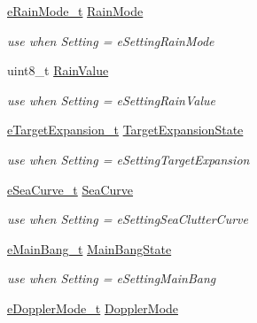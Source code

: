 \begin{DoxyCompactItemize}
\mbox{\hyperlink{namespace_quantum_lib_a881f6940f59e1d22cecd947de841b245}{e\+Rain\+Mode\+\_\+t}} \mbox{\hyperlink{union_quantum_lib_1_1_setting_data__t_1_1_value__t_ab7b3cb7d32eb42493f3e2621419b2974}{Rain\+Mode}}
\begin{DoxyCompactList}\small\item\em use when \textquotesingle{}Setting\textquotesingle{} = e\+Setting\+Rain\+Mode \end{DoxyCompactList}\item 
uint8\+\_\+t \mbox{\hyperlink{union_quantum_lib_1_1_setting_data__t_1_1_value__t_a7040a794b6b449a10ef05f067e1e8530}{Rain\+Value}}
\begin{DoxyCompactList}\small\item\em use when \textquotesingle{}Setting\textquotesingle{} = e\+Setting\+Rain\+Value \end{DoxyCompactList}\item 
\mbox{\hyperlink{namespace_quantum_lib_affbc8bc0775b14917688e0e6d2fab0fb}{e\+Target\+Expansion\+\_\+t}} \mbox{\hyperlink{union_quantum_lib_1_1_setting_data__t_1_1_value__t_aa016c87a2de4e94c31be3385d5ba7358}{Target\+Expansion\+State}}
\begin{DoxyCompactList}\small\item\em use when \textquotesingle{}Setting\textquotesingle{} = e\+Setting\+Target\+Expansion \end{DoxyCompactList}\item 
\mbox{\hyperlink{namespace_quantum_lib_aeaeea421c9323b85e6b45fa78e3b2a06}{e\+Sea\+Curve\+\_\+t}} \mbox{\hyperlink{union_quantum_lib_1_1_setting_data__t_1_1_value__t_ac99d26c718e9c0f5ecd51fadcb688146}{Sea\+Curve}}
\begin{DoxyCompactList}\small\item\em use when \textquotesingle{}Setting\textquotesingle{} = e\+Setting\+Sea\+Clutter\+Curve \end{DoxyCompactList}\item 
\mbox{\hyperlink{namespace_quantum_lib_af78fc1282ff8d85de46fff58a89f5798}{e\+Main\+Bang\+\_\+t}} \mbox{\hyperlink{union_quantum_lib_1_1_setting_data__t_1_1_value__t_a561112b3325f1d3fbc203d4f19e49afc}{Main\+Bang\+State}}
\begin{DoxyCompactList}\small\item\em use when \textquotesingle{}Setting\textquotesingle{} = e\+Setting\+Main\+Bang \end{DoxyCompactList}\item 
\mbox{\hyperlink{namespace_quantum_lib_a67a865bb9894671b27595a61dfcd44b5}{e\+Doppler\+Mode\+\_\+t}} \mbox{\hyperlink{union_quantum_lib_1_1_setting_data__t_1_1_value__t_abadb3422dd6c37a812543d0ccb9ffbb0}{Doppler\+Mode}}

\end{DoxyCompactItemize}
